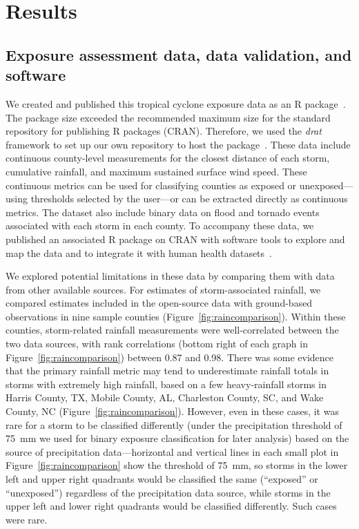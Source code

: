 \section*{Results}

\subsection*{Exposure assessment data, data validation, and software}

We created and published this tropical cyclone exposure data as an R
package~\parencite{hurricaneexposuredata}.  The package size exceeded the
recommended maximum size for the standard repository for publishing R packages
(\ac{CRAN}). Therefore, we used the \textit{drat} framework to set up our own
repository to host the package~\parencite{anderson2017hosting}. These data
include continuous county-level measurements for the closest distance of each
storm, cumulative rainfall, and maximum sustained surface wind speed. These
continuous metrics can be used for classifying counties as exposed or
unexposed---using thresholds selected by the user---or can be extracted
directly as continuous metrics. The dataset also include binary data on flood
and tornado events associated with each storm in each county. To accompany
these data, we published an associated R package on \ac{CRAN} with software
tools to explore and map the data and to integrate it with human health
datasets~\parencite{hurricaneexposure}.

We explored potential limitations in these data by comparing them with data
from other available sources.  For estimates of storm-associated rainfall, we
compared estimates included in the open-source data with ground-based
observations in nine sample counties (Figure~\ref{fig:raincomparison}). Within
these counties, storm-related rainfall measurements were well-correlated
between the two data sources, with rank correlations (bottom right of each
graph in Figure~\ref{fig:raincomparison}) between 0.87 and 0.98. There was some
evidence that the primary rainfall metric may tend to underestimate rainfall
totals in storms with extremely high rainfall, based on a few heavy-rainfall
storms in Harris County, TX, Mobile County, AL, Charleston County, SC, and Wake
County, NC (Figure~\ref{fig:raincomparison}). However, even in these cases, it
was rare for a storm to be classified differently (under the precipitation
threshold of 75~\si{\milli\metre} we used for binary exposure classification
for later analysis) based on the source of precipitation data---horizontal and
vertical lines in each small plot in Figure~\ref{fig:raincomparison} show the
threshold of 75~\si{\milli\metre}, so storms in the lower left and upper right
quadrants would be classified the same (``exposed'' or ``unexposed'')
regardless of the precipitation data source, while storms in the upper left and
lower right quadrants would be classified differently. Such cases were rare.

